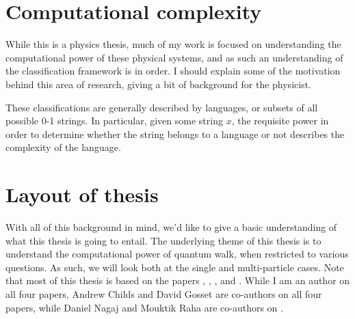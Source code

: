 \documentclass[../thesis-main/thesis-main]{subfiles}
\begin{document}

\section{Computational complexity}

While this is a physics thesis, much of my work is focused on understanding the computational power of these physical systems, and as such an understanding of the classification framework is in order.  I should explain some of the motivation behind this area of research, giving a bit of background for the physicist.

These classifications are generally described by languages, or subsets of all possible 0-1 strings.  In particular, given some string $x$, the requisite power in order to determine whether the string belongs to a language or not describes the complexity of the language.  

%
%
%





\section{Layout of thesis}

With all of this background in mind, we'd like to give a basic understanding of what this thesis is going to entail.  The underlying theme of this thesis is to understand the computational power of quantum walk, when restricted to various questions.  As such, we will look both at the single and multi-particle cases.  Note that most of this thesis is based on the papers \cite{MPQW}, \cite{momentum_switches}, \cite{BHQMA}, and \cite{xy_model}.  While I am an author on all four papers, Andrew Childs and David Gosset are co-authors on all four papers, while Daniel Nagaj and Mouktik Raha are co-authors on \cite{momentum_switches}.
\end{document}
